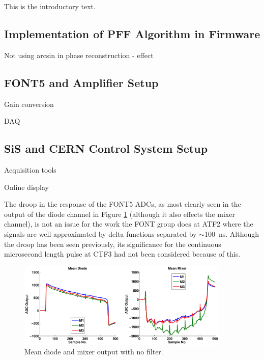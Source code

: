 
This is the introductory text.


\subsection{Implementation of PFF Algorithm in Firmware}
\label{ss:pffFirmware}

Not using arcsin in phase reconstruction - effect

\subsection{FONT5 and Amplifier Setup}
\label{ss:fontSetup}

Gain conversion

DAQ

\subsection{SiS and CERN Control System Setup}
\label{ss:sisSetup}

Acquisition tools

Online display


The droop in the response of the FONT5 ADCs, as most clearly seen in the output of the diode channel in Figure \ref{f:diodeDroop} (although it also effects the mixer channel), is not an issue for the work the FONT group does at ATF2 where the signals are well approximated by delta functions separated by \(\sim\)100~ns. Although the droop has been seen previously, its significance for the continuous microsecond length pulse at CTF3 had not been considered because of this.

\begin{figure}
  \centering
  \includegraphics[width=0.9\textwidth]{Figures/diodeDroop}
  \caption{Mean diode and mixer output with no filter.}
  \label{f:diodeDroop}
\end{figure}

